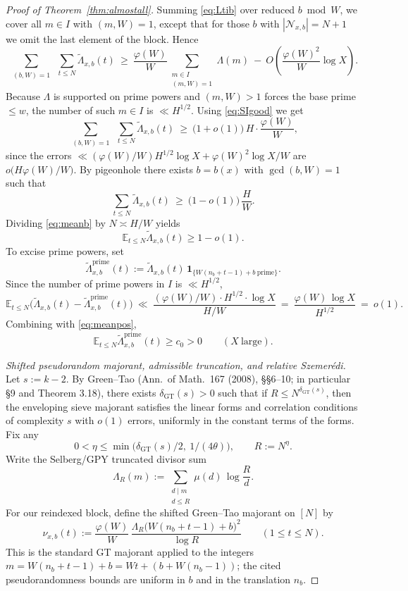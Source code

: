 \documentclass[11pt]{amsart}
\theoremstyle{definition}
\theoremstyle{remark}
\numberwithin{equation}{section}
\begin{document}
\begin{proof}[Proof of Theorem~\ref{thm:almostall}]
Summing \eqref{eq:Ltib} over reduced $b\bmod W$, we cover all $m\in I$ with $(m,W)=1$, except that for those $b$ with $|\mathcal{N}_{x,b}|=N+1$ we omit the last element of the block. Hence
\begin{equation}\label{eq:sumoverb}
\sum_{\substack{(b,W)=1}}\ \sum_{t\le N}\tilde\Lambda_{x,b}(t)
\ \ge\ \frac{\varphi(W)}{W}\sum_{\substack{m\in I\\(m,W)=1}}\!\Lambda(m)\ -\ O\!\left(\frac{\varphi(W)^2}{W}\log X\right).
\end{equation}
Because $\Lambda$ is supported on prime powers and $(m,W)>1$ forces the base prime $\le w$, the number of such $m\in I$ is $\ll H^{1/2}$. Using \eqref{eq:SIgood} we get
\[
\sum_{\substack{(b,W)=1}}\ \sum_{t\le N}\tilde\Lambda_{x,b}(t)
\ \ge\ \Big(1+o(1)\Big)\,H\cdot\frac{\varphi(W)}{W},
\]
since the errors $\ll (\varphi(W)/W)H^{1/2}\log X + \varphi(W)^2\log X/W$ are $o\big(H\varphi(W)/W\big)$. By pigeonhole there exists $b=b(x)$ with $\gcd(b,W)=1$ such that
\begin{equation}\label{eq:meanb}
\sum_{t\le N}\tilde\Lambda_{x,b}(t)\ \ge\ \Big(1-o(1)\Big)\,\frac{H}{W}.
\end{equation}
Dividing \eqref{eq:meanb} by $N\asymp H/W$ yields
\begin{equation}\label{eq:meanpos}
\mathbb{E}_{t\le N}\tilde\Lambda_{x,b}(t)\ge 1-o(1).
\end{equation}
To excise prime powers, set
\[
\tilde\Lambda^{\mathrm{prime}}_{x,b}(t):=\tilde\Lambda_{x,b}(t)\,\mathbf{1}_{\{W(n_b+t-1)+b\ \text{prime}\}}.
\]
Since the number of prime powers in $I$ is $\ll H^{1/2}$,
\[
\mathbb{E}_{t\le N}\bigl(\tilde\Lambda_{x,b}(t)-\tilde\Lambda^{\mathrm{prime}}_{x,b}(t)\bigr)
\ \ll\ \frac{(\varphi(W)/W)\cdot H^{1/2}\cdot\log X}{H/W}
\ =\ \frac{\varphi(W)\,\log X}{H^{1/2}}\ =\ o(1).
\]
Combining with \eqref{eq:meanpos},
\begin{equation}\label{eq:primepos}
\mathbb{E}_{t\le N}\tilde\Lambda^{\mathrm{prime}}_{x,b}(t)\ge c_0>0\qquad (X\ \text{large}).
\end{equation}

\smallskip
\noindent\emph{Shifted pseudorandom majorant, admissible truncation, and relative Szemerédi.}
Let $s:=k-2$. By Green–Tao (Ann.\ of Math.\ 167 (2008), \S\S6–10; in particular \S9 and Theorem 3.18), there exists $\delta_{\mathrm{GT}}(s)>0$ such that if $R\le N^{\delta_{\mathrm{GT}}(s)}$, then the enveloping sieve majorant satisfies the linear forms and correlation conditions of complexity $s$ with $o(1)$ errors, uniformly in the constant terms of the forms. Fix any
\[
0<\eta\le\min\bigl(\delta_{\mathrm{GT}}(s)/2,\ 1/(4\theta)\bigr),\qquad R:=N^{\eta}.
\]
Write the Selberg/GPY truncated divisor sum
\[
\Lambda_R(m):=\sum_{\substack{d\mid m\\ d\le R}}\mu(d)\,\log\frac{R}{d}.
\]
For our reindexed block, define the shifted Green–Tao majorant on $[N]$ by
\[
\nu_{x,b}(t):=\frac{\varphi(W)}{W}\,\frac{\Lambda_R\bigl(W(n_b+t-1)+b\bigr)^2}{\log R}\qquad(1\le t\le N).
\]
This is the standard GT majorant applied to the integers $m=W(n_b+t-1)+b=Wt+(b+W(n_b-1))$; the cited pseudorandomness bounds are uniform in $b$ and in the translation $n_b$.


\end{proof}
\end{document}
